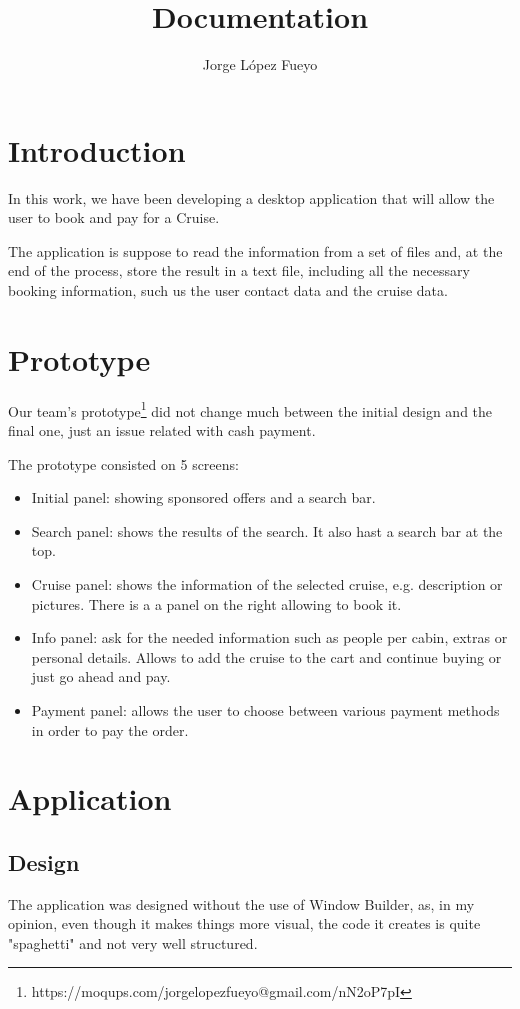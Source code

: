 \documentclass{article}
\title{Documentation}
\author{Jorge López Fueyo}
\begin{document}
   \maketitle
   \newpage
     
   \section{Introduction}
   
   In this work, we have been developing a desktop application that will allow the user to book and pay for a Cruise.

   The application is suppose to read the information from a set of files and, at the end of the process, store the result in a text file, including all the necessary booking information, such us the user contact data and the cruise data.
   
   \section{Prototype}
   Our team's prototype\footnote{https://moqups.com/jorgelopezfueyo@gmail.com/nN2oP7pI} did not change much between the initial design and the final one, just an issue related with cash payment.
   
   The prototype consisted on 5 screens:
   \begin{itemize}
	   	\item Initial panel: showing sponsored offers and a search bar.
	   	\item Search panel: shows the results of the search. It also hast a search bar at the top.
	   	\item Cruise panel: shows the information of the selected cruise, e.g. description or pictures. There is a a panel on the right allowing to book it.
	   	\item Info panel: ask for the needed information such as people per cabin, extras or personal details. Allows to add the cruise to the cart and continue buying or just go ahead and pay.
	   	\item Payment panel: allows the user to choose between various payment methods in order to pay the order. 
   \end{itemize}
   
   \section{Application}
   \subsection{Design}
   The application was designed without the use of Window Builder, as, in my opinion, even though it makes things more visual, the code it creates is quite "spaghetti" and not very well structured.
   
\end{document}
